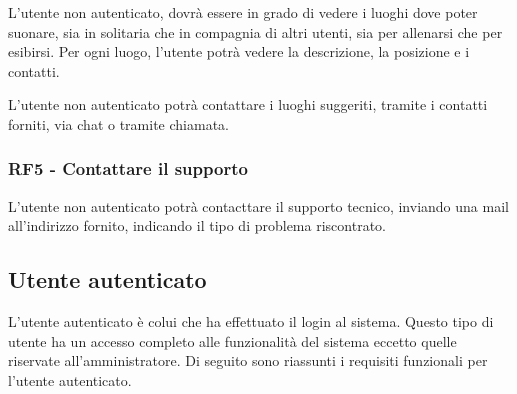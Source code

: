 \documentclass[12pt, a4paper]{article}
\begin{document}
L'utente non autenticato, dovrà essere in grado di vedere i luoghi dove poter suonare, sia in solitaria che in compagnia di altri utenti, sia per allenarsi che per esibirsi. Per ogni luogo, l'utente potrà vedere la descrizione, la posizione e i contatti.

L'utente non autenticato potrà contattare i luoghi suggeriti, tramite i contatti forniti, via chat o tramite chiamata.

\subsubsection*{\hypertarget{RF5}{RF5 - Contattare il supporto}}

L'utente non autenticato potrà contacttare il supporto tecnico, inviando una mail all'indirizzo fornito, indicando il tipo di problema riscontrato.


\newpage
\subsection{Utente autenticato}

L'utente autenticato è colui che ha effettuato il login al sistema. Questo tipo di utente ha un accesso completo alle funzionalità del sistema eccetto quelle riservate all'amministratore. Di seguito sono riassunti i requisiti funzionali per l'utente autenticato.
\end{document}
